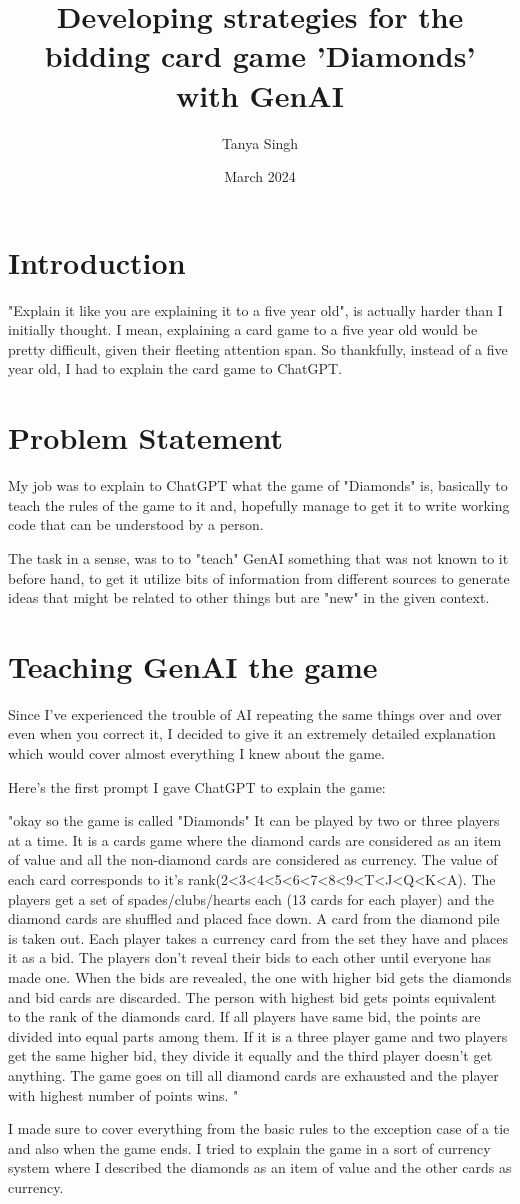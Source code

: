 \documentclass{article}
\title{Developing strategies for the bidding card game 'Diamonds' with GenAI}
\author{Tanya Singh}
\date{March 2024}
\begin{document}
\maketitle

\section{Introduction}
"Explain it like you are explaining it to a five year old", is actually harder than I initially thought. I mean, explaining a card game to a five year old would be pretty difficult, given their fleeting attention span. So thankfully, instead of a five year old, I had to explain the card game to ChatGPT.

\section{Problem Statement}
My job was to explain to ChatGPT what the game of "Diamonds" is, basically to teach the rules of the game to it and, hopefully manage to get it to write working code that can be understood by a person.

The task in a sense, was to to "teach" GenAI something that was not known to it before hand, to get it utilize bits of information from different sources to generate ideas that might be related to other things but are "new" in the given context. 


\section{Teaching GenAI the game}
Since I've experienced the trouble of AI repeating the same things over and over even when you correct it, I decided to give it an extremely detailed explanation which would cover almost everything I knew about the game.

Here's the first prompt I gave ChatGPT to explain the game:

"okay so the game is called "Diamonds" It can be played by two or three players at a time. 
It is a cards game where the diamond cards are considered as an item of value and all the non-diamond cards are considered as currency. 
The value of each card corresponds to it's rank(2<3<4<5<6<7<8<9<T<J<Q<K<A). 
The players get a set of spades/clubs/hearts each (13 cards for each player) and the diamond cards are shuffled and placed face down. 
A card from the diamond pile is taken out. Each player takes a currency card from the set they have and places it as a bid. 
The players don't reveal their bids to each other until everyone has made one. When the bids are revealed, the one with higher bid gets the diamonds and bid cards are discarded. 
The person with highest bid gets points equivalent to the rank of the diamonds card. If all players have same bid, the points are divided into equal parts among them. 
If it is a three player game and two players get the same higher bid, they divide it equally and the third player doesn't get anything. 
The game goes on till all diamond cards are exhausted and the player with highest number of points wins.
"

I made sure to cover everything from the basic rules to the exception case of a tie and also when the game ends. I tried to explain the game in a sort of currency system where I described the diamonds as an item of value and the other cards as currency.
\end{document}
